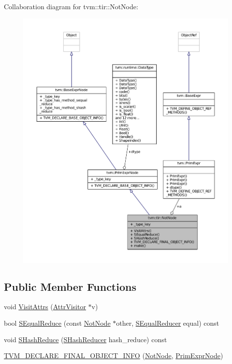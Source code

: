 Collaboration diagram for tvm\+:\+:tir\+:\+:Not\+Node\+:
\nopagebreak
\begin{figure}[H]
\begin{center}
\leavevmode
\includegraphics[width=350pt]{classtvm_1_1tir_1_1NotNode__coll__graph}
\end{center}
\end{figure}
\subsection*{Public Member Functions}
\begin{DoxyCompactItemize}
\item 
void \hyperlink{classtvm_1_1tir_1_1NotNode_a82114b9eeaf685c4b6b578118a7d3fcf}{Visit\+Attrs} (\hyperlink{classtvm_1_1AttrVisitor}{Attr\+Visitor} $\ast$v)
\item 
bool \hyperlink{classtvm_1_1tir_1_1NotNode_a3849a18cd408ba26a793231feb120287}{S\+Equal\+Reduce} (const \hyperlink{classtvm_1_1tir_1_1NotNode}{Not\+Node} $\ast$other, \hyperlink{classtvm_1_1SEqualReducer}{S\+Equal\+Reducer} equal) const 
\item 
void \hyperlink{classtvm_1_1tir_1_1NotNode_ad33e550eef3dcdf991f58b4b87c617b3}{S\+Hash\+Reduce} (\hyperlink{classtvm_1_1SHashReducer}{S\+Hash\+Reducer} hash\+\_\+reduce) const 
\item 
\hyperlink{classtvm_1_1tir_1_1NotNode_a0dbf6ad54254f41e88d5a7b0e419c8db}{T\+V\+M\+\_\+\+D\+E\+C\+L\+A\+R\+E\+\_\+\+F\+I\+N\+A\+L\+\_\+\+O\+B\+J\+E\+C\+T\+\_\+\+I\+N\+FO} (\hyperlink{classtvm_1_1tir_1_1NotNode}{Not\+Node}, \hyperlink{classtvm_1_1PrimExprNode}{Prim\+Expr\+Node})
\end{DoxyCompactItemize}
